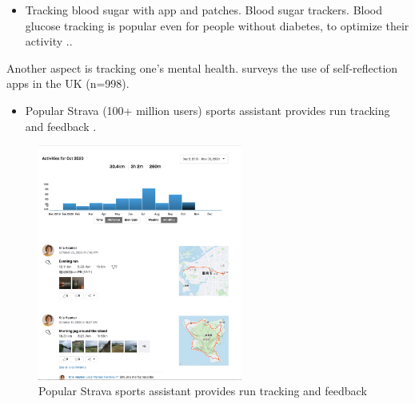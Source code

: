 \documentclass[
  letterpaper,
  DIV=11,
  numbers=noendperiod]{scrartcl}
\providecommand{\tightlist}{%
  \setlength{\itemsep}{0pt}\setlength{\parskip}{0pt}}\usepackage{longtable,booktabs,array}
\begin{document}
\begin{itemize}
\tightlist
\item
  Tracking blood sugar with app and patches. Blood sugar trackers. Blood
  glucose tracking is popular even for people without diabetes, to
  optimize their activity \citep{BloodSugarMonitoring2021}..
\end{itemize}

Another aspect is tracking one's mental health.
\citep{tylerContemporarySelfreflectivePractices2022} surveys the use of
self-reflection apps in the UK (n=998).

\begin{itemize}
\tightlist
\item
  Popular Strava (100+ million users) sports assistant provides run
  tracking and feedback \citep{stravaStravaGlobalCommunity2022}.
\end{itemize}

\begin{figure}[H]

{\centering \includegraphics[width=0.6\textwidth,height=\textheight]{./images/strava.png}

}

\caption{Popular Strava sports assistant provides run tracking and
feedback}

\end{figure}%
\end{document}
